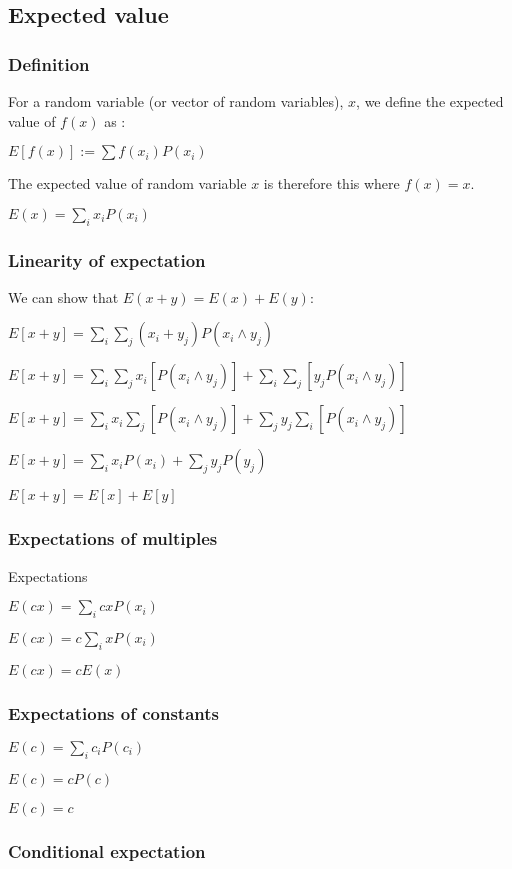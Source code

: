 
\subsection{Expected value}
\subsubsection{Definition}

For a random variable (or vector of random variables), \(x\), we define the expected value of \(f(x)\) as :

$E[f(x)]:=\sum f(x_i) P(x_i)$

The expected value of random variable \(x\) is therefore this where \(f(x)=x\).

$E(x)=\sum_i x_i P(x_i)$

\subsubsection{Linearity of expectation}

We can show that \(E(x+y)=E(x)+E(y)\):

$E[x+y]=\sum_i \sum_j (x_i+y_j) P(x_i \land y_j)$

$E[x+y]=\sum_i \sum_j x_i [P(x_i \land y_j)]+\sum_i \sum_j [y_j P(x_i \land y_j)]$

$E[x+y]=\sum_i x_i \sum_j [P(x_i \land y_j)]+\sum_j y_j \sum_i [P(x_i \land y_j)]$

$E[x+y]=\sum_i x_i P(x_i)+\sum_j y_j P(y_j) $

$E[x+y]=E[x]+E[y]$

\subsubsection{Expectations of multiples}

Expectations

$E(cx)=\sum_i cx P(x_i)$

$E(cx)=c\sum_i x P(x_i)$

$E(cx)=cE(x)$

\subsubsection{Expectations of constants}

$E(c)=\sum_i c_i P(c_i)$

$E(c)= c P(c)$

$E(c)= c$

\subsubsection{Conditional expectation}

